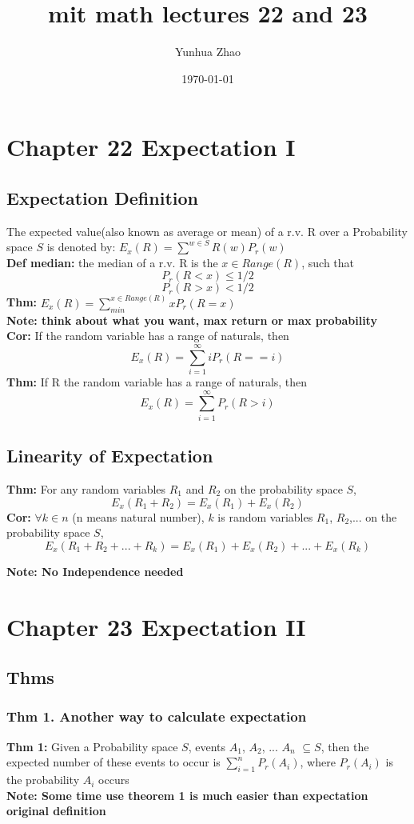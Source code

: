 \documentclass{article}
\title{mit math lectures 22 and 23}
\author{Yunhua Zhao}
\date{\today}
\begin{document}
\maketitle

\section{Chapter 22 Expectation I} 
\subsection{Expectation Definition}
The expected value(also known as average or mean) of a r.v. R over a Probability space $S$ is denoted by:
$E_x(R)=\sum ^{w \in S}R(w)P_r(w)$  \\
\textbf{Def median:} the median of a r.v. R is the $x\in Range(R)$, such that 
$$P_r(R<x)\leqslant 1/2$$
$$P_r(R>x)< 1/2$$
\textbf{Thm:} $E_x(R)=\sum_{min}^{x\in Range(R)}xP_r(R=x)$  \\

\textbf{Note: think about what you want, max return or max probability}\\
\textbf{Cor:} If the random variable has a range of naturals, then 
$$ E_x(R)=\sum_{i=1}^{\infty}iP_r(R==i) $$
\textbf{Thm:} If R the random variable has a range of naturals, then
$$  E_x(R)=\sum_{i=1}^{\infty}P_r(R>i) $$

\subsection{Linearity of Expectation}
\textbf{Thm:} For any random variables $R_1$ and $R_2$ on the probability space $S$, 
$$ E_x(R_1+R_2)=E_x(R_1)+E_x(R_2) $$
\textbf{Cor:} $\forall k\in n$ (n means natural number), $k$ is random variables $R_1$, $R_2$,... on the probability space $S$,
$$ E_x(R_1+R_2+...+R_k)=E_x(R_1)+E_x(R_2)+...+E_x(R_k) $$

\textbf{Note: No Independence needed}\\

\section{Chapter 23 Expectation II} 
\subsection{Thms}
\subsubsection{Thm 1. Another way to calculate expectation}
\textbf{Thm 1:} Given a Probability space $S$, events $A_1$, $A_2$, ... $A_n$ $\subseteq S$, then the expected number of these events to occur is $\sum_{i=1}^{n}P_r(A_i)$, where $P_r(A_i)$ is the probability $A_i$ occurs \\
\textbf{Note: Some time use theorem 1 is much easier than expectation original definition}\\
\end{document}
